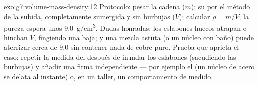\begin{solution}{exo:g7:volume-mass-density:12}
Protocolo: pesar la cadena ($m$);  su  por el
método de la subida, completamente sumergida y sin burbujas ($V$);
calcular $\rho = m/V$; la pureza espera unos \qty{9.0}{g/cm^3}. Dudas
honradas: los eslabones huecos atrapan  e hinchan $V$, fingiendo
una  baja; y una mezcla astuta (o un núcleo con baño) puede
aterrizar cerca de $9.0$ sin contener nada de cobre puro. Prueba que
aprieta el caso: repetir la medida del  después de inundar
los eslabones (sacudiendo las burbujas) y añadir una firma
independiente --- por ejemplo el  (un núcleo de acero se delata
al instante) o, en un taller, un comportamiento de  medido.
\end{solution}

